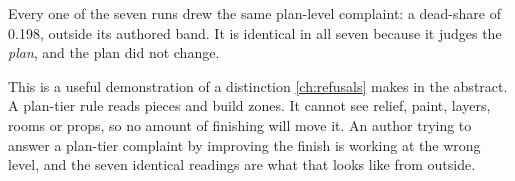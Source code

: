 Every one of the seven runs drew the same plan-level complaint: a dead-share of
0.198, outside its authored band. It is identical in all seven because it judges
the \emph{plan}, and the plan did not change.

This is a useful demonstration of a distinction \cref{ch:refusals} makes in the
abstract. A plan-tier rule reads pieces and build zones. It cannot see relief, paint,
layers, rooms or props, so no amount of finishing will move it. An author trying to
answer a plan-tier complaint by improving the finish is working at the wrong level,
and the seven identical readings are what that looks like from outside.

